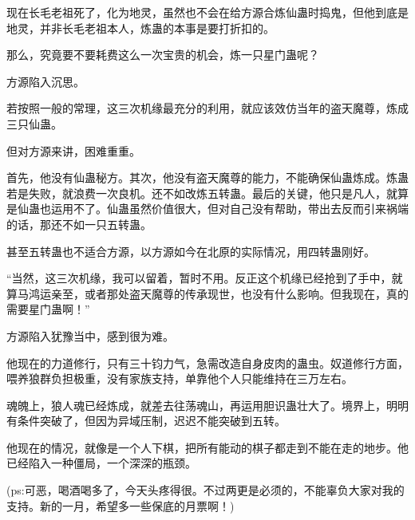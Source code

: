 \begin{this_body}
现在长毛老祖死了，化为地灵，虽然也不会在给方源合炼仙蛊时捣鬼，但他到底是地灵，并非长毛老祖本人，炼蛊的本事是要打折扣的。

那么，究竟要不要耗费这么一次宝贵的机会，炼一只星门蛊呢？

方源陷入沉思。

若按照一般的常理，这三次机缘最充分的利用，就应该效仿当年的盗天魔尊，炼成三只仙蛊。

但对方源来讲，困难重重。

首先，他没有仙蛊秘方。其次，他没有盗天魔尊的能力，不能确保仙蛊炼成。炼蛊若是失败，就浪费一次良机。还不如改炼五转蛊。最后的关键，他只是凡人，就算是仙蛊也运用不了。仙蛊虽然价值很大，但对自己没有帮助，带出去反而引来祸端的话，那还不如一只五转蛊。

甚至五转蛊也不适合方源，以方源如今在北原的实际情况，用四转蛊刚好。

“当然，这三次机缘，我可以留着，暂时不用。反正这个机缘已经抢到了手中，就算马鸿运亲至，或者那处盗天魔尊的传承现世，也没有什么影响。但我现在，真的需要星门蛊啊！”

方源陷入犹豫当中，感到很为难。

他现在的力道修行，只有三十钧力气，急需改造自身皮肉的蛊虫。奴道修行方面，喂养狼群负担极重，没有家族支持，单靠他个人只能维持在三万左右。

魂魄上，狼人魂已经炼成，就差去往荡魂山，再运用胆识蛊壮大了。境界上，明明有条件突破了，但因为异域压制，迟迟不能突破到五转。

他现在的情况，就像是一个人下棋，把所有能动的棋子都走到不能在走的地步。他已经陷入一种僵局，一个深深的瓶颈。

(ps:可恶，喝酒喝多了，今天头疼得很。不过两更是必须的，不能辜负大家对我的支持。新的一月，希望多一些保底的月票啊！)

\end{this_body}

